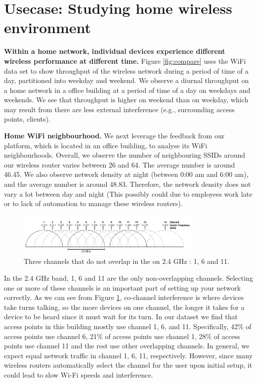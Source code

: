 \section{Usecase: Studying home wireless environment}
\label{sec.usecase3}

\textbf{Within a home network, individual devices experience different wireless performance at different time.} Figure \ref{fig:compare} uses the WiFi data set to show throughput of the wireless network during a period of time of a day, partitioned into weekday and weekend. We observe a diurnal throughput on a home network in a office building at a period of time of a day on weekdays and weekends. We see that throughput is higher on weekend than on weekday, which may result from there are less external interference (e.g., surrounding access points, clients).

\textbf{Home WiFi neighbourhood.} We next leverage the feedback from our platform, which is located in an office building, to analyse its WiFi neighbourhoods. Overall, we observe the number of neighbouring SSIDs around our wireless router varies between 26 and 64. The average number is around 46.45. We also observe network density at night (between 0:00 am and 6:00 am), and the average number is around 48.83. Therefore, the network density does not vary a lot between day and night (This possibly could due to employees work late or to lack of automation to manage these wireless routers).

\begin{figure}
\centering
\includegraphics[width=0.8\textwidth]{figure/2GHz_WiFi_channels.png}
\caption{Three channels that do not overlap in the on 2.4 GHz : 1, 6 and 11\cite{wlanchannels}.} 
\label{fig:channels}
\end{figure}

In the 2.4 GHz band, 1, 6 and 11 are the only non-overlapping channels. Selecting one or more of these channels is an important part of setting up your network correctly. As we can see from Figure \ref{fig:channels}, co-channel interference is where devices take turns talking, so the more devices on one channel, the longer it takes for a device to be heard since it must wait for its turn. In our dataset we find that access points in this building mostly use channel 1, 6, and 11. Specifically, 42\% of access points use channel 6, 21\% of access points use channel 1, 28\% of access points use channel 11 and the rest use other overlapping channels. In general, we expect equal network traffic in channel 1, 6, 11, respectively. However, since many wireless routers automatically select the channel for the user upon initial setup, it could lead to slow Wi-Fi speeds and interference. 

